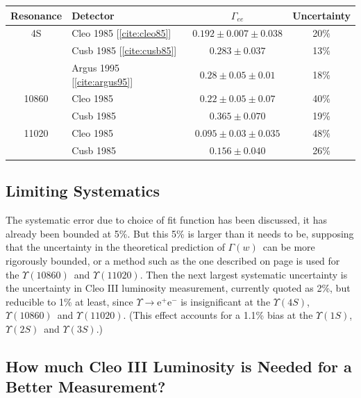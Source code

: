 \documentclass[12pt]{article}
\def\yis{$\Upsilon(1S)$}
\def\yiis{$\Upsilon(2S)$}
\def\yiiis{$\Upsilon(3S)$}
\def\yivs{$\Upsilon(4S)$}
\def\yvs{$\Upsilon(10860)$}
\def\yvis{$\Upsilon(11020)$}
\def\gamofw{$\Gamma(w)$}
\begin{document}
\begin{center}
  \begin{tabular}{c | l | c | c}
    Resonance & Detector & $\Gamma_{ee}$ & Uncertainty \\\hline\hline
    4S & {\sc Cleo} 1985 [\ref{cite:cleo85}] & $0.192 \pm 0.007 \pm 0.038$ & 20\% \\
       & {\sc Cusb} 1985 [\ref{cite:cusb85}] & $0.283 \pm 0.037$ & 13\% \\
       & {\sc Argus} 1995 [\ref{cite:argus95}] & $0.28 \pm 0.05 \pm 0.01$ & 18\% \\\hline

    10860 & {\sc Cleo} 1985 & $0.22 \pm 0.05 \pm 0.07$ & 40\% \\
          & {\sc Cusb} 1985 & $0.365 \pm 0.070$ & 19\% \\\hline

    11020 & {\sc Cleo} 1985 & $0.095 \pm 0.03 \pm 0.035$ & 48\% \\
          & {\sc Cusb} 1985 & $0.156 \pm 0.040$ & 26\% \\
  \end{tabular}
\end{center}

\subsection{Limiting Systematics}

The systematic error due to choice of fit function has been discussed,
it has already been bounded at 5\%. But this 5\% is larger than it
needs to be, supposing that the uncertainty in the theoretical
prediction of \gamofw\ can be more rigorously bounded, or a method
such as the one described on page \pageref{page:freedom} is used for
the \yvs\ and \yvis. Then the next largest systematic uncertainty is
the uncertainty in {\sc Cleo III} luminosity measurement, currently
quoted as 2\%, but reducible to 1\% at least, since $\Upsilon \to
\mbox{e$^+$e$^-$}$ is insignificant at the \yivs, \yvs\ and \yvis.
(This effect accounts for a 1.1\% bias at the \yis, \yiis\ and
\yiiis.)


\subsection{How much {\sc Cleo III} Luminosity is Needed for a Better Measurement?}
\end{document}
